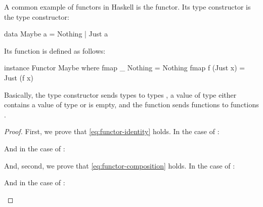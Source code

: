 \begin{example}
  \label{ex:functor-maybe-haskell}


  A common example of functors in Haskell is the 
  functor. Its type constructor is the  type
  constructor:
  \begin{codehaskell}
data Maybe a = Nothing | Just a
  \end{codehaskell}
  Its  function is defined as follows:
  \begin{codehaskell}
instance Functor Maybe where
  fmap _ Nothing  = Nothing
  fmap f (Just x) = Just (f x)
  \end{codehaskell}
  Basically, the  type constructor sends types
   to types , a value of type
   either contains a value of type
   or is empty, and the  function
  sends functions  to functions .

  \begin{proof}

    First, we prove that \eqref{eq:functor-identity} holds. In the
    case of :
    \begin{steps}
    \end{steps}
    And in the case of :
    \begin{steps}
    \end{steps}
    And, second, we prove that \eqref{eq:functor-composition} holds.
    In the case of :
    \begin{steps}
    \end{steps}
    And in the case of :
    \begin{steps}
    \end{steps}

  \end{proof}

\end{example}

